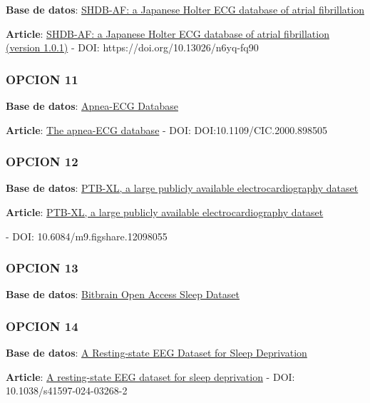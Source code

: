 \documentclass[10pt]{article}
\begin{document}
\textbf{Base de datos}: \href{https://physionet.org/content/shdb-af/1.0.1/}{SHDB-AF: a Japanese Holter ECG database of atrial fibrillation
}

\textbf{Article}: \href{https://www.nature.com/articles/s41597-025-04777-4}{SHDB-AF: a Japanese Holter ECG database of atrial fibrillation (version 1.0.1)} - DOI: https://doi.org/10.13026/n6yq-fq90

\subsubsection*{OPCION 11}

\textbf{Base de datos}: \href{https://physionet.org/content/apnea-ecg/1.0.0/}{Apnea-ECG Database}

\textbf{Article}: \href{https://www.researchgate.net/publication/3884869_The_apnea-ECG_database}{The apnea-ECG database} - DOI: DOI:10.1109/CIC.2000.898505

\subsubsection*{OPCION 12}

\textbf{Base de datos}: \href{https://physionet.org/content/ptb-xl/1.0.3/}{PTB-XL, a large publicly available electrocardiography dataset
}

\textbf{Article}: \href{https://iopscience.iop.org/article/10.1088/0967-3334/35/8/1521/meta}{PTB-XL, a large publicly available electrocardiography dataset} 

- DOI: 10.6084/m9.figshare.12098055

\subsubsection*{OPCION 13}

\textbf{Base de datos}: \href{https://openneuro.org/datasets/ds005555/versions/1.1.1}{ Bitbrain Open Access Sleep Dataset}

\subsubsection*{OPCION 14}

\textbf{Base de datos}: \href{https://openneuro.org/datasets/ds004902/versions/1.0.8}{ A Resting-state EEG Dataset for Sleep Deprivation}

\textbf{Article}: \href{https://www.nature.com/articles/s41597-024-03268-2}{A resting-state EEG dataset for sleep deprivation} - DOI: 10.1038/s41597-024-03268-2
\end{document}
